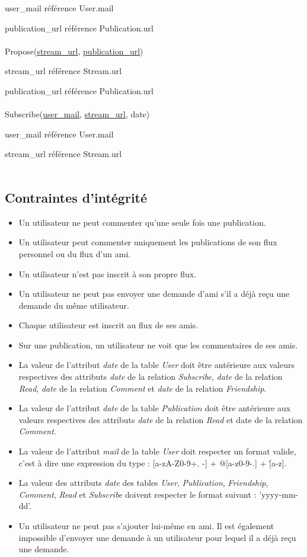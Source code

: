 \documentclass[a4paper,10pt]{article}
\begin{document}
user\_mail référence User.mail

publication\_url référence Publication.url
\\\\
Propose(\underline {stream\_url}, \underline {publication\_url})

stream\_url référence Stream.url

publication\_url référence Publication.url
\\\\
Subscribe(\underline {user\_mail}, \underline {stream\_url}, date)

user\_mail référence User.mail

stream\_url référence Stream.url
\\\\

\subsection{Contraintes d’intégrité}

	\begin{itemize}
	    \item Un utilisateur ne peut commenter qu'une seule fois une publication.
	    \item Un utilisateur peut commenter uniquement les publications de son flux personnel ou du flux d'un ami.
	    \item Un utilisateur n'est pas inscrit à son propre flux.
	    \item Un utilisateur ne peut pas envoyer une demande d'ami s'il a déjà reçu une demande du même utilisateur.
	    \item Chaque utilisateur est inscrit au flux de ses amis.
	    \item Sur une publication, un utilisateur ne voit que les commentaires de ses amis.
	    \item La valeur de l'attribut \textsl{date} de la table \textsl{User} doit être antérieure aux valeurs respectives des attributs \textsl{date} de la relation \textsl{Subscribe}, \textsl{date} de la relation \textsl{Read}, \textsl{date} de la relation \textsl{Comment} et \textsl{date} de la relation \textsl{Friendship}.
	    \item La valeur de l'attribut \textsl{date} de la table \textsl{Publication} doit être antérieure aux valeurs respectives des attributs \textsl{date} de la relation \textsl{Read} et date de la relation \textsl{Comment}.
	    \item La valeur de l'attribut \textsl{mail} de la table \textsl{User} doit respecter un format valide, c'est à dire une expression du type : [a-zA-Z0-9+. -] + @[a-z0-9-.] + \.[a-z].
	    \item La valeur des attributs \textsl{date} des tables \textsl{User}, \textsl{Publication}, \textsl{Friendship}, \textsl{Comment}, \textsl{Read} et \textsl{Subscribe} doivent respecter le format suivant : 'yyyy-mm-dd'.
	    \item Un utilisateur ne peut pas s'ajouter lui-même en ami. Il est également impossible d'envoyer une demande à un utilisateur pour lequel il a déjà reçu une demande.
	\end{itemize}
\end{document}
